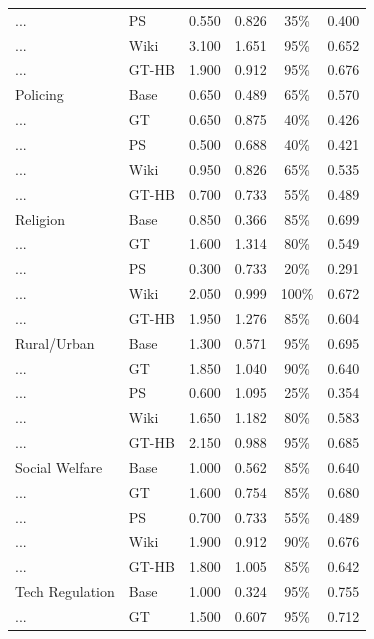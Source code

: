 \documentclass[12pt]{article}
\begin{document}
\begin{longtable}{llcccc}
    ...              & PS   & 0.550 & 0.826 & 35\% & 0.400 \\
    ...              & Wiki & 3.100 & 1.651 & 95\% & 0.652 \\
    ...              & GT-HB & 1.900 & 0.912 & 95\% & 0.676 \\
    \addlinespace
    Policing         & Base & 0.650 & 0.489 & 65\% & 0.570 \\
    ...              & GT   & 0.650 & 0.875 & 40\% & 0.426 \\
    ...              & PS   & 0.500 & 0.688 & 40\% & 0.421 \\
    ...              & Wiki & 0.950 & 0.826 & 65\% & 0.535 \\
    ...              & GT-HB & 0.700 & 0.733 & 55\% & 0.489 \\
    \addlinespace
    Religion         & Base & 0.850 & 0.366 & 85\% & 0.699 \\
    ...              & GT   & 1.600 & 1.314 & 80\% & 0.549 \\
    ...              & PS   & 0.300 & 0.733 & 20\% & 0.291 \\
    ...              & Wiki & 2.050 & 0.999 & 100\% & 0.672 \\
    ...              & GT-HB & 1.950 & 1.276 & 85\% & 0.604 \\
    \addlinespace
    Rural/Urban      & Base & 1.300 & 0.571 & 95\% & 0.695 \\
    ...              & GT   & 1.850 & 1.040 & 90\% & 0.640 \\
    ...              & PS   & 0.600 & 1.095 & 25\% & 0.354 \\
    ...              & Wiki & 1.650 & 1.182 & 80\% & 0.583 \\
    ...              & GT-HB & 2.150 & 0.988 & 95\% & 0.685 \\
    \addlinespace
    Social Welfare   & Base & 1.000 & 0.562 & 85\% & 0.640 \\
    ...              & GT   & 1.600 & 0.754 & 85\% & 0.680 \\
    ...              & PS   & 0.700 & 0.733 & 55\% & 0.489 \\
    ...              & Wiki & 1.900 & 0.912 & 90\% & 0.676 \\
    ...              & GT-HB & 1.800 & 1.005 & 85\% & 0.642 \\
    \addlinespace
    Tech Regulation  & Base & 1.000 & 0.324 & 95\% & 0.755 \\
    ...              & GT   & 1.500 & 0.607 & 95\% & 0.712 \\

\end{longtable}
\end{document}
